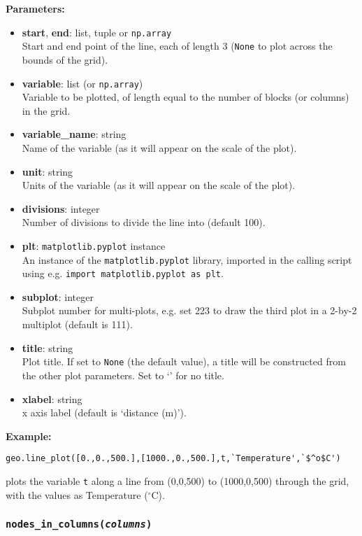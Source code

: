 \textbf{Parameters:}
\begin{itemize}
\item \textbf{start}, \textbf{end}: list, tuple or \texttt{np.array}\\
  Start and end point of the line, each of length 3 (\texttt{None} to plot across the bounds of the grid).
\item \textbf{variable}: list (or \texttt{np.array})\\
  Variable to be plotted, of length equal to the number of blocks (or columns) in the grid.
\item \textbf{variable\_name}: string\\
  Name of the variable (as it will appear on the scale of the plot).
\item \textbf{unit}: string\\
  Units of the variable (as it will appear on the scale of the plot).
\item \textbf{divisions}: integer\\
  Number of divisions to divide the line into (default 100).
\item \textbf{plt}: \texttt{matplotlib.pyplot} instance\\
  An instance of the \texttt{matplotlib.pyplot} library, imported in the calling script using e.g. \texttt{import matplotlib.pyplot as plt}.
\item \textbf{subplot}: integer\\
  Subplot number for multi-plots, e.g. set 223 to draw the third plot in a 2-by-2 multiplot (default is 111).
\item \textbf{title}: string\\
  Plot title.  If set to \texttt{None} (the default value), a title will be constructed from the other plot parameters.  Set to `' for no title.
\item \textbf{xlabel}: string\\
  x axis label (default is `distance (m)').
\end{itemize}

\textbf{Example:}

\begin{verbatim}
geo.line_plot([0.,0.,500.],[1000.,0.,500.],t,`Temperature',`$^o$C')
\end{verbatim}

plots the variable \texttt{t} along a line from (0,0,500) to (1000,0,500) through the grid, with the values as Temperature ($^{\circ}$C).

\subsubsection{\texttt{nodes\_in\_columns(\emph{columns})}}

